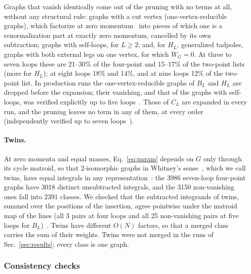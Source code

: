 Graphs that vanish identically come out of the pruning with no terms at all, without any structural rule: graphs with a
cut vertex (one-vertex-reducible graphs), which factorize at zero momentum~\cite{Ribeca2003thesis} into pieces of which
one is a renormalization part at exactly zero momentum, cancelled by its own subtraction; graphs with self-loops,
for $L\ge2$; and, for $H_L$, generalized tadpoles, graphs with both external legs on one vertex, for which $W_G=0$. At
three to seven loops these are 21--30\% of the four-point and 15--17\% of the two-point lists (more for $H_L$); at
eight loops 18\% and 14\%, and at nine loops 12\% of the two-point list. In production runs the one-vertex-reducible
graphs of $B_L$ and $H_L$ are dropped before the expansion; their vanishing, and that of the graphs with self-loops, was
verified explicitly up to five loops~. Those of $C_L$ are expanded in every run, and the pruning leaves no
term in any of them, at every order (independently verified up to seven loops~).

\paragraph{Twins.}
At zero momenta and equal masses, Eq.~\eqref{eq:param} depends on $G$ only through its cycle matroid, so that
2-isomorphic graphs in Whitney's sense~\cite{Whitney1933}, which we call twins, have equal integrals in any
representation~\cite{Ribeca2003thesis}: the 3986 seven-loop four-point graphs have 3018 distinct unsubtracted integrals,
and the 3150 non-vanishing ones fall into 2391 classes. We checked that the subtracted integrands of twins, summed over
the positions of the insertion, agree pointwise under the matroid map of the lines (all 3 pairs at four loops and all 25
non-vanishing pairs at five loops for $B_L$)~. Twins have different $O(N)$ factors, so that a merged class carries the
sum of their weights. Twins were not merged in the runs of Sec.~\ref{sec:results}: every class is one graph.

\subsubsection{Consistency checks}
\label{sec:methods-checks}

